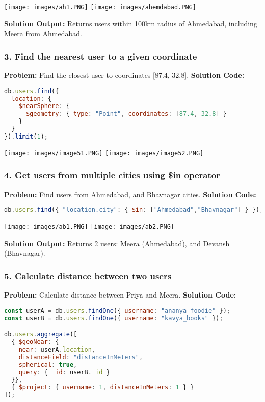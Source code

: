 \documentclass[12pt,a4paper]{article}
\begin{document}
\begin{center}
\texttt{[image: images/ah1.PNG]}
\texttt{[image: images/ahemdabad.PNG]}
\end{center}
\textbf{Solution Output:} Returns users within 100km radius of Ahmedabad, including Meera from Ahmedabad.

\subsubsection{3. Find the nearest user to a given coordinate}
\textbf{Problem:} Find the closest user to coordinates [87.4, 32.8].
\textbf{Solution Code:}
\begin{lstlisting}[language=JavaScript]
db.users.find({
  location: {
    $nearSphere: {
      $geometry: { type: "Point", coordinates: [87.4, 32.8] }
    }
  }
}).limit(1);
\end{lstlisting}

\begin{center}
\texttt{[image: images/image51.PNG]}
\texttt{[image: images/image52.PNG]}
\end{center}

\subsubsection{4. Get users from multiple cities using \$in operator}
\textbf{Problem:} Find users from Ahmedabad, and Bhavnagar cities.
\textbf{Solution Code:}
\begin{lstlisting}[language=JavaScript]
db.users.find({ "location.city": { $in: ["Ahmedabad","Bhavnagar"] } });
\end{lstlisting}

\begin{center}
\texttt{[image: images/ab1.PNG]}
\texttt{[image: images/ab2.PNG]}
\end{center}
\textbf{Solution Output:} Returns 2 users: Meera (Ahmedabad), and Devansh (Bhavnagar).


\subsubsection{5. Calculate distance between two users}
\textbf{Problem:} Calculate distance between Priya and Meera.
\textbf{Solution Code:}
\begin{lstlisting}[language=JavaScript]
const userA = db.users.findOne({ username: "ananya_foodie" });
const userB = db.users.findOne({ username: "kavya_books" });

db.users.aggregate([
  { $geoNear: {
    near: userA.location,
    distanceField: "distanceInMeters",
    spherical: true,
    query: { _id: userB._id }
  }},
  { $project: { username: 1, distanceInMeters: 1 } }
]);
\end{lstlisting}
\end{document}
